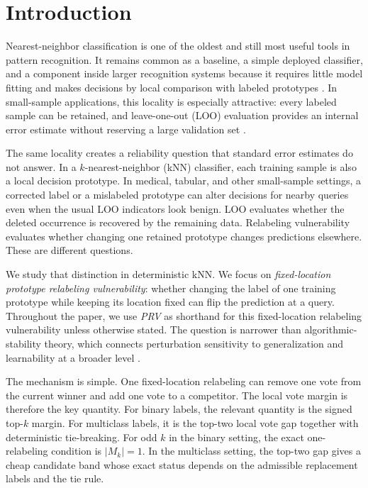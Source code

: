 \section{Introduction}
\label{sec:introduction}

Nearest-neighbor classification is one of the oldest and still most useful tools in pattern recognition.  It remains common as a baseline, a simple deployed classifier, and a component inside larger recognition systems because it requires little model fitting and makes decisions by local comparison with labeled prototypes \cite{fix1951discriminatory,cover1967nearest,devroye1996probabilistic}.  In small-sample applications, this locality is especially attractive: every labeled sample can be retained, and leave-one-out (LOO) evaluation provides an internal error estimate without reserving a large validation set \cite{kearns1999algorithmic,rogers1978finite,devroye1979distribution}.

The same locality creates a reliability question that standard error estimates do not answer.  In a $k$-nearest-neighbor (kNN) classifier, each training sample is also a local decision prototype.  In medical, tabular, and other small-sample settings, a corrected label or a mislabeled prototype can alter decisions for nearby queries even when the usual LOO indicators look benign.  LOO evaluates whether the deleted occurrence is recovered by the remaining data.  Relabeling vulnerability evaluates whether changing one retained prototype changes predictions elsewhere.  These are different questions.

We study that distinction in deterministic kNN.  We focus on \emph{fixed-location prototype relabeling vulnerability}: whether changing the label of one training prototype while keeping its location fixed can flip the prediction at a query.  Throughout the paper, we use \emph{PRV} as shorthand for this fixed-location relabeling vulnerability unless otherwise stated.  The question is narrower than algorithmic-stability theory, which connects perturbation sensitivity to generalization and learnability at a broader level \cite{bousquet2002stability,shalev2010learnability,hardt2016train}.

The mechanism is simple.  One fixed-location relabeling can remove one vote from the current winner and add one vote to a competitor.  The local vote margin is therefore the key quantity.  For binary labels, the relevant quantity is the signed top-$k$ margin.  For multiclass labels, it is the top-two local vote gap together with deterministic tie-breaking.  For odd $k$ in the binary setting, the exact one-relabeling condition is $|M_k|=1$.  In the multiclass setting, the top-two gap gives a cheap candidate band whose exact status depends on the admissible replacement labels and the tie rule.

